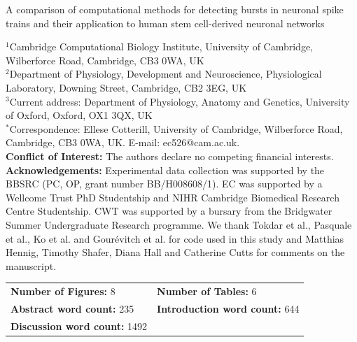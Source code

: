 \documentclass[12pt, titlepage]{article}
\begin{document}
	\begin{titlepage}
	
		\begin{center}
	
			{\LARGE   A comparison of computational methods for detecting bursts in neuronal spike trains and their application to human stem cell-derived neuronal networks}
			\\ 
			\end{center}
		\noindent$^1$Cambridge Computational Biology Institute, University of Cambridge, Wilberforce Road, Cambridge, CB3 0WA, UK
		\\$^2$Department of Physiology, Development and Neuroscience, Physiological Laboratory, Downing Street, Cambridge, CB2 3EG, UK
                \\$^3$Current address: Department of Physiology, Anatomy and Genetics, 
University of Oxford, Oxford, OX1 3QX, UK
		\\$^*$Correspondence: Ellese Cotterill, University of Cambridge, Wilberforce Road, Cambridge,
		CB3 0WA, UK. E-mail: ec526@cam.ac.uk.
		\bigskip \\ \textbf{Conflict of Interest:} The authors declare no competing financial interests.
		\bigskip \\ \textbf{Acknowledgements:} Experimental data collection was supported by the BBSRC (PC, OP, grant number BB/H008608/1). EC was supported by a Wellcome Trust PhD Studentship and NIHR Cambridge Biomedical Research Centre Studentship.  CWT was supported by a bursary from the Bridgwater Summer Undergraduate Research programme. We thank Tokdar et al., Pasquale et al., Ko et al. and Gour\'{e}vitch et al. for code used in this study and Matthias Hennig, Timothy Shafer, Diana Hall and Catherine Cutts for comments on the manuscript. 
	\\ \begin{tabular}{m{8cm}l}\\\textbf{Number of Figures:} 8
		 &  \textbf{Number of Tables:} 6
		\\ \textbf{Abstract word count:} 235
		 &  \textbf{Introduction word count:} 644
		\\ \textbf{Discussion word count:} 1492
		\end{tabular}
	
		
	\end{titlepage} 
\end{document}
